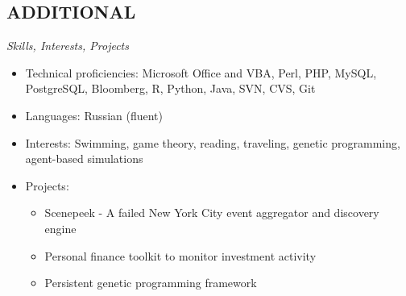 \documentclass{res}
\begin{document}
\begin{resume}
\section{ADDITIONAL} 
\vspace{1pt}
{\sl Skills, Interests, Projects}
\begin{itemize} \itemsep -2pt
  \item Technical proficiencies: Microsoft Office and VBA, Perl, PHP, MySQL, PostgreSQL, Bloomberg, R, Python, Java, SVN, CVS, Git
  \item Languages: Russian (fluent)
  \item Interests: Swimming, game theory, reading, traveling, genetic programming, agent-based simulations
  \item Projects: \vspace{-6pt}
    \begin{itemize} \itemsep -2pt
    \item Scenepeek - A failed New York City event aggregator and discovery engine
    \item Personal finance toolkit to monitor investment activity
    \item Persistent genetic programming framework
    \end{itemize} \vspace{0px}
\end{itemize} \vspace{0px}

\end{resume} 
\end{document}
